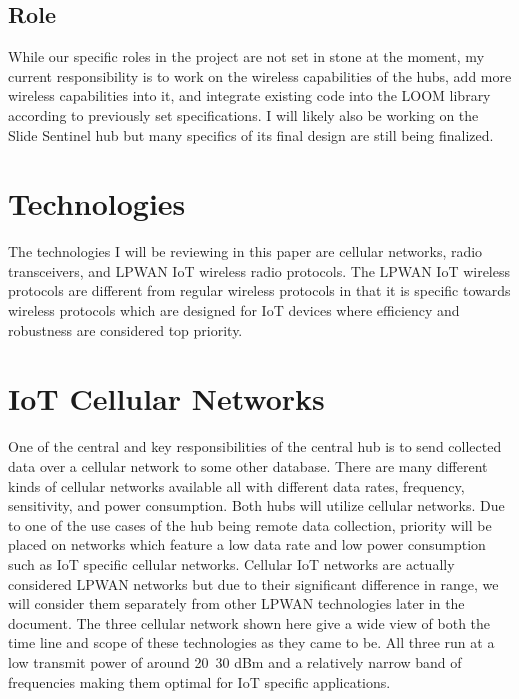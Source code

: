 \documentclass[draftclsnofoot,onecolumn, 10pt, compsoc]{IEEEtran}
\begin{document}
	\subsection{Role}
	While our specific roles in the project are not set in stone at the moment, my current responsibility is to work on the wireless capabilities of the hubs, add more wireless capabilities into it, and integrate existing code into the LOOM library according to previously set specifications. I will likely also be working on the Slide Sentinel hub but many specifics of its final design are still being finalized.
	
	\section{Technologies}
	The technologies I will be reviewing in this paper are cellular networks, radio transceivers, and LPWAN IoT wireless radio protocols. The LPWAN IoT wireless protocols are different from regular wireless protocols in that it is specific towards wireless protocols which are designed for IoT devices where efficiency and robustness are considered top priority.
	

	\section{IoT Cellular Networks}
	One of the central and key responsibilities of the central hub is to send collected data over a cellular network to some other database. There are many different kinds of cellular networks available all with different data rates, frequency, sensitivity, and power consumption. Both hubs will utilize cellular networks. Due to one of the use cases of the hub being remote data collection, priority will be placed on networks which feature a low data rate and low power consumption such as IoT specific cellular networks. Cellular IoT networks are actually considered LPWAN networks but due to their significant difference in range, we will consider them separately from other LPWAN technologies later in the document. The three cellular network shown here give a wide view of both the time line and scope of these technologies as they came to be. All three run at a low transmit power of around 20~30 dBm and a relatively narrow band of frequencies making them optimal for IoT specific applications.
	
\end{document}
